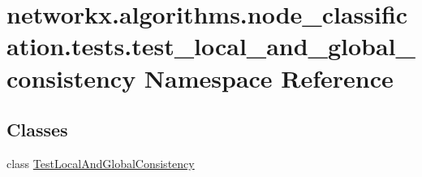\hypertarget{namespacenetworkx_1_1algorithms_1_1node__classification_1_1tests_1_1test__local__and__global__consistency}{}\section{networkx.\+algorithms.\+node\+\_\+classification.\+tests.\+test\+\_\+local\+\_\+and\+\_\+global\+\_\+consistency Namespace Reference}
\label{namespacenetworkx_1_1algorithms_1_1node__classification_1_1tests_1_1test__local__and__global__consistency}
\subsection*{Classes}
\begin{DoxyCompactItemize}
\item 
class \hyperlink{classnetworkx_1_1algorithms_1_1node__classification_1_1tests_1_1test__local__and__global__consisb7079825a7c9941d86ebc12e4a07c2a9}{Test\+Local\+And\+Global\+Consistency}
\end{DoxyCompactItemize}
